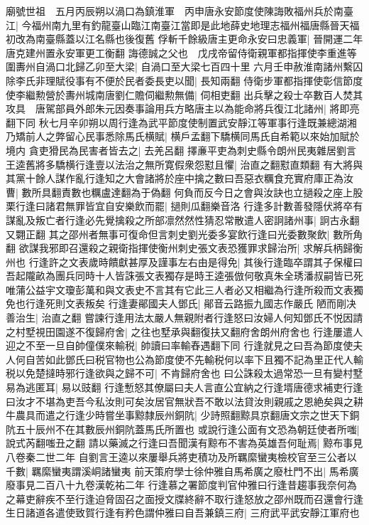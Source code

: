 廟號世祖　五月丙辰朔以渦口為鎮淮軍　丙申唐永安節度使陳誨敗福州兵於南臺江|{
	今福州南九里有釣龍臺山臨江南臺江當即是此地薛史地理志福州福唐縣晉天福初改為南臺縣蓋以江名縣也後復舊}
俘斬千餘級唐主更命永安曰忠義軍|{
	晉開運二年唐克建州置永安軍更工衡翻}
誨德誠之父也　戊戌帝留侍衛親軍都指揮使李重進等圍夀州自渦口北歸乙卯至大梁|{
	自渦口至大梁七百四十里}
六月壬申赦淮南諸州繫囚除李氏非理賦役事有不便於民者委長吏以聞|{
	長知兩翻}
侍衛步軍都指揮使彰信節度使李繼勲營於夀州城南唐劉仁贍伺繼勲無備|{
	伺相吏翻}
出兵擊之殺士卒數百人焚其攻具　唐駕部員外郎朱元因奏事論用兵方略唐主以為能命將兵復江北諸州|{
	將即亮翻下同}
秋七月辛卯朔以周行逢為武平節度使制置武安靜江等軍事行逢既兼總湖湘乃矯前人之弊留心民事悉除馬氏横賦|{
	横戶孟翻下驕横同馬氏自希範以來始加賦於境内}
貪吏猾民為民害者皆去之|{
	去羌呂翻}
擇亷平吏為刺史縣令朗州民夷雜居劉言王逵舊將多驕横行逢壹以法治之無所寛假衆怨懟且懼|{
	治直之翻懟直類翻}
有大將與其黨十餘人謀作亂行逢知之大會諸將於座中擒之數曰吾惡衣糲食充實府庫正為汝曹|{
	數所具翻責數也糲盧達翻為于偽翻}
何負而反今日之會與汝訣也立撾殺之座上股栗行逢曰諸君無罪皆宜自安樂飲而罷|{
	撾則瓜翻樂音洛}
行逢多計數善發隱伏將卒有謀亂及叛亡者行逢必先覺擒殺之所部凛然然性猜忍常散遣人密詗諸州事|{
	詗古永翻又翾正翻}
其之邵州者無事可復命但言刺史劉光委多宴飲行逢曰光委數聚飲|{
	數所角翻}
欲謀我邪即召還殺之親衛指揮使衡州刺史張文表恐獲罪求歸治所|{
	求解兵柄歸衡州也}
行逢許之文表歲時饋獻甚厚及謹事左右由是得免|{
	其後行逢臨卒謂其子保權曰吾起隴畝為團兵同時十人皆誅張文表獨存是時王逵張倣何敬真朱全琇潘叔嗣皆已死唯蒲公益宇文瓊彭萬和與文表史不言其有它此三人者必又相繼為行逢所殺而文表獨免也行逢死則文表叛矣}
行逢妻鄖國夫人鄧氏|{
	鄖音云路振九國志作嚴氏}
陋而剛决善治生|{
	治直之翻}
嘗諫行逢用法太嚴人無親附者行逢怒曰汝婦人何知鄧氏不悦因請之村墅視田園遂不復歸府舍|{
	之往也墅承與翻復扶又翻府舍朗州府舍也}
行逢屢遣人迎之不至一旦自帥僮僕來輸税|{
	帥讀曰率輸舂遇翻下同}
行逢就見之曰吾為節度使夫人何自苦如此鄧氏曰税官物也公為節度使不先輸税何以率下且獨不記為里正代人輸税以免楚撻時邪行逢欲與之歸不可|{
	不肯歸府舍也}
曰公誅殺太過常恐一旦有變村墅易為逃匿耳|{
	易以豉翻}
行逢慙怒其僚屬曰夫人言直公宜納之行逢壻唐德求補吏行逢曰汝才不堪為吏吾今私汝則可矣汝居官無狀吾不敢以法貸汝則親戚之恩絶矣與之耕牛農具而遣之行逢少時嘗坐事黥隸辰州銅阬|{
	少詩照翻黥具京翻唐文宗之世天下銅阬五十辰州不在其數辰州銅阬蓋馬氏所置也}
或說行逢公面有文恐為朝廷使者所嗤|{
	說式芮翻嗤丑之翻}
請以藥滅之行逢曰吾聞漢有黥布不害為英雄吾何耻焉|{
	黥布事見八卷秦二世二年}
自劉言王逵以來屢舉兵將吏積功及所羈縻蠻夷檢校官至三公者以千數|{
	羈縻蠻夷謂溪峒諸蠻夷}
前天策府學士徐仲雅自馬希廣之廢杜門不出|{
	馬希廣廢事見二百八十九卷漢乾祐二年}
行逢慕之署節度判官仲雅曰行逢昔趨事我奈何為之幕吏辭疾不至行逢迫脅固召之面授文牒終辭不取行逢怒放之邵州既而召還會行逢生日諸道各遣使致賀行逢有矜色謂仲雅曰自吾兼鎮三府|{
	三府武平武安靜江軍府也}

